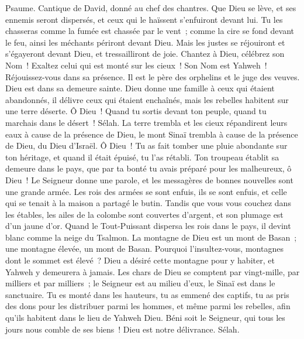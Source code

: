 \begin{multicols}{2}
\VerseOne{}Psaume. Cantique de David, donné au chef des chantres.
Que Dieu se lève, et ses ennemis seront dispersés, et ceux qui le haïssent s'enfuiront devant lui.
Tu les chasseras comme la fumée est chassée par le vent~; comme la cire se fond devant le feu, ainsi les méchants périront devant Dieu.
Mais les justes se réjouiront et s'égayeront devant Dieu, et tressailliront de joie.
Chantez à Dieu, célébrez son Nom~! Exaltez celui qui est monté sur les cieux~! Son Nom est Yahweh~! Réjouissez-vous dans sa présence.
Il est le père des orphelins et le juge des veuves. Dieu est dans sa demeure sainte.
Dieu donne une famille à ceux qui étaient abandonnés, il délivre ceux qui étaient enchaînés, mais les rebelles habitent sur une terre déserte.
Ô Dieu~! Quand tu sortis devant ton peuple, quand tu marchais dans le désert~! Sélah.
La terre trembla et les cieux répandirent leurs eaux à cause de la présence de Dieu, le mont Sinaï trembla à cause de la présence de Dieu, du Dieu d'Israël.
Ô Dieu~! Tu as fait tomber une pluie abondante sur ton héritage, et quand il était épuisé, tu l'as rétabli.
Ton troupeau établit sa demeure dans le pays, que par ta bonté tu avais préparé pour les malheureux, ô Dieu~!
Le Seigneur donne une parole, et les messagères de bonnes nouvelles sont une grande armée.
Les rois des armées se sont enfuis, ils se sont enfuis, et celle qui se tenait à la maison a partagé le butin.
Tandis que vous vous couchez dans les étables, les ailes de la colombe sont couvertes d'argent, et son plumage est d'un jaune d'or.
Quand le Tout-Puissant dispersa les rois dans le pays, il devint blanc comme la neige du Tsalmon.
La montagne de Dieu est un mont de Basan~; une montagne élevée, un mont de Basan.
Pourquoi l'insultez-vous, montagnes dont le sommet est élevé~? Dieu a désiré cette montagne pour y habiter, et Yahweh y demeurera à jamais.
Les chars de Dieu se comptent par vingt-mille, par milliers et par milliers~; le Seigneur est au milieu d'eux, le Sinaï est dans le sanctuaire.
Tu es monté dans les hauteurs, tu as emmené des captifs, tu as pris des dons pour les distribuer parmi les hommes, et même parmi les rebelles, afin qu'ils habitent dans le lieu de Yahweh Dieu.
Béni soit le Seigneur, qui tous les jours nous comble de ses biens~! Dieu est notre délivrance. Sélah.

\end{multicols}
